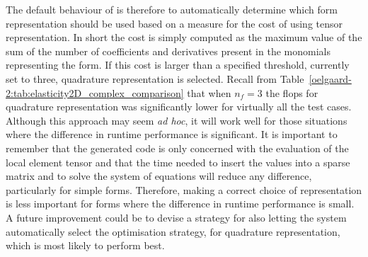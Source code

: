 The default behaviour of \ffc{} is therefore to automatically determine which
form representation should be used based on a measure for the cost of using
tensor representation.
In short the cost is simply computed as the maximum value of the sum of the
number of coefficients and derivatives present in the monomials representing
the form.
If this cost is larger than a specified threshold, currently set to three,
quadrature representation is selected.
Recall from Table~\ref{oelgaard-2:tab:elasticity2D_complex_comparison} that
when $n_f=3$ the flops for quadrature representation was significantly lower
for virtually all the test cases.
Although this approach may seem \emph{ad hoc}, it will work well for those
situations where the difference in runtime performance is significant.
It is important to remember that the generated code is only concerned with the
evaluation of the local element tensor and that the time needed to insert the
values into a sparse matrix and to solve the system of equations will
reduce any difference, particularly for simple forms.
Therefore, making a correct choice of representation is less important for
forms where the difference in runtime performance is small.
A future improvement could be to devise a strategy for also letting the system
automatically select the optimisation strategy, for quadrature representation,
which is most likely to perform best.

